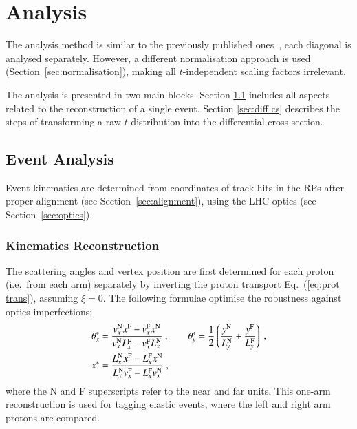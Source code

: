 \section{Analysis}

The analysis method is similar to the previously published ones~\cite{epl101-el,prl111}, each diagonal is analysed
separately. However, a different normalisation
approach is used (Section~\ref{sec:normalisation}), making all 
$t$-independent scaling factors irrelevant.

The analysis is presented in two main blocks. Section \ref{sec:event anal} includes all aspects related to the reconstruction of a single event.
Section \ref{sec:diff cs} describes the steps of transforming a raw $t$-distribution into the differential cross-section.


\subsection{Event Analysis}
\label{sec:event anal}

Event kinematics are determined from coordinates of track hits in the RPs after proper alignment (see Section~\ref{sec:alignment}), using the LHC optics (see Section~\ref{sec:optics}).



\subsubsection{Kinematics Reconstruction}
\label{sec:kinematics}

The scattering angles and vertex position are first determined for each proton (i.e.~from each arm) separately by inverting the proton transport Eq.~(\ref{eq:prot trans}), assuming $\xi = 0$. The following formulae optimise the robustness against optics imperfections:
\begin{equation}
\label{eq:kin 1a}
	\begin{aligned}
		\theta_x^* &= {v_x^{\rm N} x^{\rm F} - v_x^{\rm F} x^{\rm N}\over v_x^{\rm N} L_x^{\rm F} - v_x^{\rm F} L_x^{\rm N}}\ ,\qquad
		\theta_y^* = {1\over 2} \left( {y^{\rm N}\over L_y^{\rm N}} + {y^{\rm F}\over L_y^{\rm F}} \right)\ ,\\
		x^* &= {L_x^{\rm N} x^{\rm F} - L_x^{\rm F} x^{\rm N}\over L_x^{\rm N} v_x^{\rm F} - L_x^{\rm F} v_x^{\rm N}}\ , \\
	\end{aligned}
\end{equation}
where the N and F superscripts refer to the near and far units. This one-arm reconstruction is used for tagging elastic events, where the left and right arm protons are compared.

